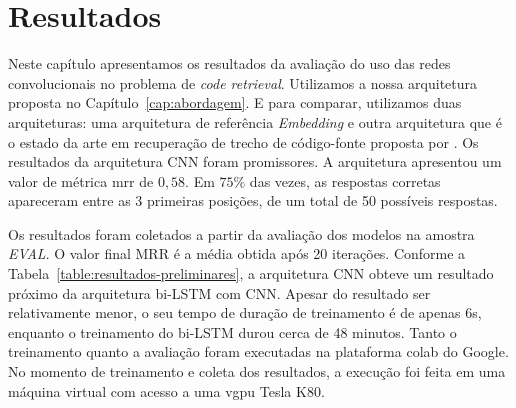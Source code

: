 \chapter{Resultados}
\label{cap:resultados}

Neste capítulo apresentamos os resultados da avaliação do uso das redes convolucionais no problema de \textit{code retrieval}. Utilizamos a nossa arquitetura proposta no Capítulo~\ref{cap:abordagem}. E para comparar, utilizamos duas arquiteturas: uma arquitetura de referência \textit{Embedding} e outra arquitetura que é o estado da arte em recuperação de trecho de código-fonte proposta por \cite{cambronero-deep-learning-code-search:2019}. Os resultados da arquitetura CNN foram promissores. A arquitetura apresentou um valor de métrica \acrfull{mrr} de $0,58$.  Em $75\%$ das vezes, as respostas corretas apareceram entre as 3 primeiras posições, de um total de 50 possíveis respostas. 



Os resultados foram coletados a partir da avaliação dos modelos na amostra \emph{EVAL}. O valor final MRR é a média obtida após 20 iterações. Conforme a Tabela~\ref{table:resultados-preliminares},  a arquitetura CNN obteve um resultado próximo da arquitetura bi-LSTM com CNN. Apesar do resultado ser relativamente menor, o seu tempo de duração de treinamento é de apenas 6s, enquanto o treinamento do bi-LSTM durou cerca de 48 minutos. Tanto o treinamento quanto a avaliação foram executadas na plataforma \Gls{colab} do Google. No momento de treinamento e coleta dos resultados, a execução foi feita em uma máquina virtual com acesso a uma \acrshort{vgpu} Tesla K80.

